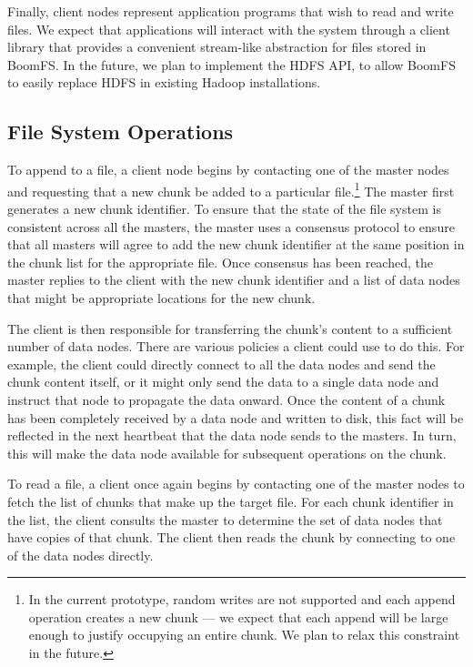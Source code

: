 \documentclass[twocolumn]{article}
\begin{document}
Finally, client nodes represent application programs that wish to read
and write files. We expect that applications will interact with the
system through a client library that provides a convenient stream-like
abstraction for files stored in BoomFS. In the future, we plan to
implement the HDFS API, to allow BoomFS to easily replace HDFS in
existing Hadoop installations.

\subsection{File System Operations}
\label{fs-ops}
To append to a file, a client node begins by contacting one of the
master nodes and requesting that a new chunk be added to a particular
file.\footnote{In the current prototype, random writes are not
  supported and each append operation creates a new chunk --- we
  expect that each append will be large enough to justify occupying an
  entire chunk. We plan to relax this constraint in the future.} The
master first generates a new chunk identifier. To ensure that the
state of the file system is consistent across all the masters, the
master uses a consensus protocol to ensure that all masters will agree
to add the new chunk identifier at the same position in the chunk list
for the appropriate file. Once consensus has been reached, the master
replies to the client with the new chunk identifier and a list of data
nodes that might be appropriate locations for the new chunk.

The client is then responsible for transferring the chunk's content to
a sufficient number of data nodes. There are various policies a client
could use to do this. For example, the client could directly connect
to all the data nodes and send the chunk content itself, or it might
only send the data to a single data node and instruct that node to
propagate the data onward. Once the content of a chunk has been
completely received by a data node and written to disk, this fact will
be reflected in the next heartbeat that the data node sends to the
masters. In turn, this will make the data node available for
subsequent operations on the chunk.

To read a file, a client once again begins by contacting one of the
master nodes to fetch the list of chunks that make up the target
file. For each chunk identifier in the list, the client consults the
master to determine the set of data nodes that have copies of that
chunk. The client then reads the chunk by connecting to one of the
data nodes directly.
\end{document}
